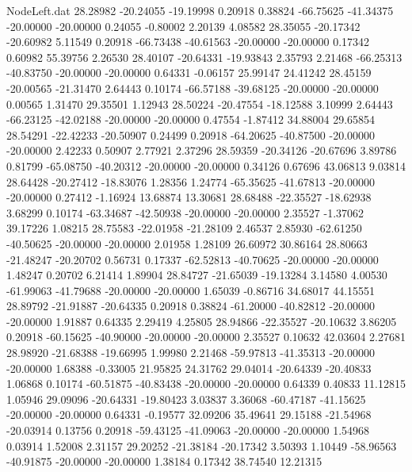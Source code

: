 \begin{filecontents}{NodeLeft.dat}
  28.28982  -20.24055  -19.19998     0.20918    0.38824  -66.75625  -41.34375  -20.00000  -20.00000    0.24055   -0.80002    2.20139    4.08582
  28.35055  -20.17342  -20.60982     5.11549    0.20918  -66.73438  -40.61563  -20.00000  -20.00000    0.17342    0.60982   55.39756    2.26530
  28.40107  -20.64331  -19.93843     2.35793    2.21468  -66.25313  -40.83750  -20.00000  -20.00000    0.64331   -0.06157   25.99147   24.41242
  28.45159  -20.00565  -21.31470     2.64443    0.10174  -66.57188  -39.68125  -20.00000  -20.00000    0.00565    1.31470   29.35501    1.12943
  28.50224  -20.47554  -18.12588     3.10999    2.64443  -66.23125  -42.02188  -20.00000  -20.00000    0.47554   -1.87412   34.88004   29.65854
  28.54291  -22.42233  -20.50907     0.24499    0.20918  -64.20625  -40.87500  -20.00000  -20.00000    2.42233    0.50907    2.77921    2.37296
  28.59359  -20.34126  -20.67696     3.89786    0.81799  -65.08750  -40.20312  -20.00000  -20.00000    0.34126    0.67696   43.06813    9.03814
  28.64428  -20.27412  -18.83076     1.28356    1.24774  -65.35625  -41.67813  -20.00000  -20.00000    0.27412   -1.16924   13.68874   13.30681
  28.68488  -22.35527  -18.62938     3.68299    0.10174  -63.34687  -42.50938  -20.00000  -20.00000    2.35527   -1.37062   39.17226    1.08215
  28.75583  -22.01958  -21.28109     2.46537    2.85930  -62.61250  -40.50625  -20.00000  -20.00000    2.01958    1.28109   26.60972   30.86164
  28.80663  -21.48247  -20.20702     0.56731    0.17337  -62.52813  -40.70625  -20.00000  -20.00000    1.48247    0.20702    6.21414    1.89904
  28.84727  -21.65039  -19.13284     3.14580    4.00530  -61.99063  -41.79688  -20.00000  -20.00000    1.65039   -0.86716   34.68017   44.15551
  28.89792  -21.91887  -20.64335     0.20918    0.38824  -61.20000  -40.82812  -20.00000  -20.00000    1.91887    0.64335    2.29419    4.25805
  28.94866  -22.35527  -20.10632     3.86205    0.20918  -60.15625  -40.90000  -20.00000  -20.00000    2.35527    0.10632   42.03604    2.27681
  28.98920  -21.68388  -19.66995     1.99980    2.21468  -59.97813  -41.35313  -20.00000  -20.00000    1.68388   -0.33005   21.95825   24.31762
  29.04014  -20.64339  -20.40833     1.06868    0.10174  -60.51875  -40.83438  -20.00000  -20.00000    0.64339    0.40833   11.12815    1.05946
  29.09096  -20.64331  -19.80423     3.03837    3.36068  -60.47187  -41.15625  -20.00000  -20.00000    0.64331   -0.19577   32.09206   35.49641
  29.15188  -21.54968  -20.03914     0.13756    0.20918  -59.43125  -41.09063  -20.00000  -20.00000    1.54968    0.03914    1.52008    2.31157
  29.20252  -21.38184  -20.17342     3.50393    1.10449  -58.96563  -40.91875  -20.00000  -20.00000    1.38184    0.17342   38.74540   12.21315

\end{filecontents}
